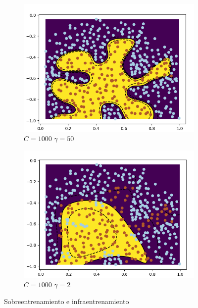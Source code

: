 \begin{figure}[H]
	\begin{subfigure}{0.48\textwidth}
    	\includegraphics[width=\linewidth, height=1\linewidth]{img/dataset2_4}	
    	\caption{$C=1000$ $\gamma=50$}
	\end{subfigure}
	\begin{subfigure}{0.48\textwidth}
    	\includegraphics[width=\linewidth, height=1\linewidth]{img/dataset2_3}	
    	\caption{$C=1000$ $\gamma=2$}
	\end{subfigure}
	\caption{Sobreentrenamiento e infraentrenamiento}
	\label{sobreentrenamiento_infraentrenamiento}
\end{figure}

